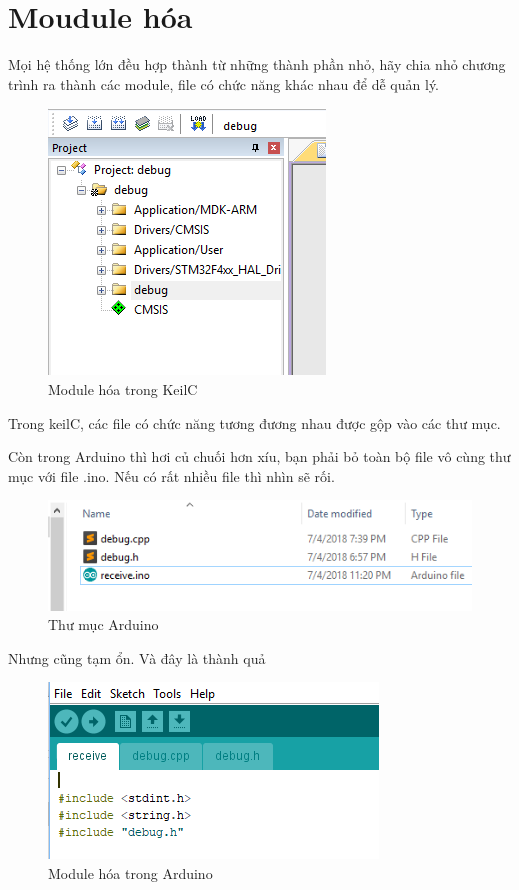 \section{Moudule hóa}

Mọi hệ thống lớn đều hợp thành từ những thành phần nhỏ, hãy chia nhỏ chương trình ra thành các module, file có chức năng khác nhau để dễ quản lý.
\begin{figure}[h!]
\centering
 \includegraphics[width=0.6\linewidth]{images/module.png}
 \caption{Module hóa trong KeilC}
\end{figure}

Trong keilC, các file có chức năng tương đương nhau được gộp vào các thư mục.


Còn trong Arduino thì hơi củ chuối hơn xíu, bạn phải bỏ toàn bộ file vô cùng thư mục với file .ino. Nếu có rất nhiều file thì nhìn sẽ rối.
\newpage 
\begin{figure}[h!]
\centering
 \includegraphics[width=1\linewidth]{images/arduino_folder.png}
 \caption{Thư mục Arduino}
\end{figure}

Nhưng cũng tạm ổn. Và đây là thành quả
\begin{figure}[h!]
\centering
 \includegraphics[width=0.8\linewidth]{images/arduino.png}
 \caption{Module hóa trong Arduino}
\end{figure}

